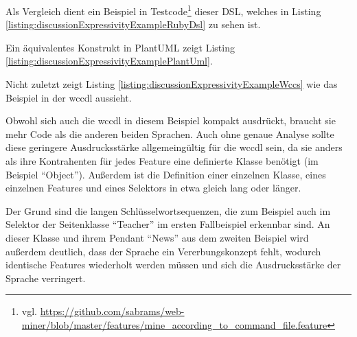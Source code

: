     Als Vergleich dient ein Beispiel in
    Testcode\footnote{vgl. \url{https://github.com/sabrams/web-miner/blob/master/features/mine_according_to_command_file.feature}}
    dieser DSL, welches in Listing \ref{listing:discussionExpressivityExampleRubyDsl}
    zu sehen ist.

    

    Ein äquivalentes Konstrukt in PlantUML zeigt Listing
    \ref{listing:discussionExpressivityExamplePlantUml}.

    

    Nicht zuletzt zeigt Listing \ref{listing:discussionExpressivityExampleWccs}
    wie das Beispiel in der \gls{wccdl} aussieht.

    

    Obwohl sich auch die \gls{wccdl} in diesem Beispiel kompakt ausdrückt,
    braucht sie mehr Code als die anderen beiden Sprachen.
    Auch ohne genaue Analyse sollte diese geringere Ausdrucksstärke
    allgemeingültig für die \gls{wccdl} sein,
    da sie anders als ihre Kontrahenten für jedes Feature eine definierte Klasse
    benötigt (im Beispiel "`Object"').
    Außerdem ist die Definition einer einzelnen Klasse,
    eines einzelnen Features und eines Selektors in etwa gleich lang oder länger.

    Der Grund sind die langen Schlüsselwortsequenzen,
    die zum Beispiel auch im Selektor der Seitenklasse "`Teacher"'
    im ersten Fallbeispiel erkennbar sind.
    An dieser Klasse und ihrem Pendant "`News"' aus dem zweiten Beispiel
    wird außerdem deutlich, dass der Sprache ein Vererbungskonzept fehlt,
    wodurch identische Features wiederholt werden müssen
    und sich die Ausdrucksstärke der Sprache verringert.


